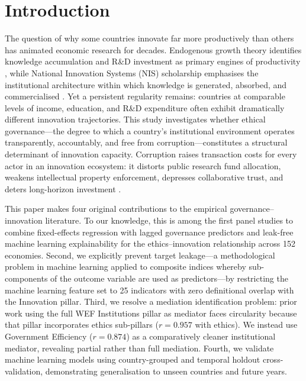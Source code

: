 \documentclass[pdflatex,sn-apa]{sn-jnl}
\begin{document}

\maketitle

\section{Introduction}
\label{sec:introduction}

The question of why some countries innovate far more productively than others has animated economic research for decades. Endogenous growth theory identifies knowledge accumulation and R\&D investment as primary engines of productivity \citep{romer1990,aghion1992}, while National Innovation Systems (NIS) scholarship emphasises the institutional architecture within which knowledge is generated, absorbed, and commercialised \citep{freeman1987,lundvall1992,nelson1993}. Yet a persistent regularity remains: countries at comparable levels of income, education, and R\&D expenditure often exhibit dramatically different innovation trajectories. This study investigates whether ethical governance---the degree to which a country's institutional environment operates transparently, accountably, and free from corruption---constitutes a structural determinant of innovation capacity. Corruption raises transaction costs for every actor in an innovation ecosystem: it distorts public research fund allocation, weakens intellectual property enforcement, depresses collaborative trust, and deters long-horizon investment \citep{mauro1995,meon2005,north1990}.

This paper makes four original contributions to the empirical governance--innovation literature. To our knowledge, this is among the first panel studies to combine fixed-effects regression with lagged governance predictors and leak-free machine learning explainability for the ethics--innovation relationship across 152 economies. Second, we explicitly prevent target leakage---a methodological problem in machine learning applied to composite indices whereby sub-components of the outcome variable are used as predictors---by restricting the machine learning feature set to 25 indicators with zero definitional overlap with the Innovation pillar. Third, we resolve a mediation identification problem: prior work using the full WEF Institutions pillar as mediator faces circularity because that pillar incorporates ethics sub-pillars ($r=0.957$ with ethics). We instead use Government Efficiency ($r=0.874$) as a comparatively cleaner institutional mediator, revealing partial rather than full mediation. Fourth, we validate machine learning models using country-grouped and temporal holdout cross-validation, demonstrating generalisation to unseen countries and future years.
\end{document}
